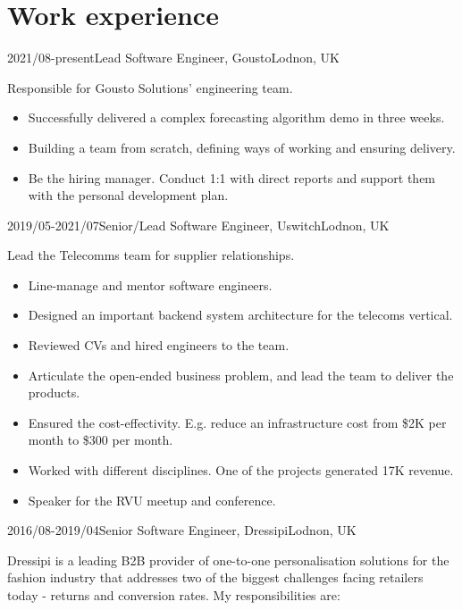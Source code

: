 \documentclass[a4paper]{twentysecondcv-english} %
\begin{document}
\section{Work experience}

\begin{twenty} %
	\twentyitem
	    {2021/08-present}{Lead Software Engineer, Gousto}{Lodnon, UK}
    	{Responsible for Gousto Solutions' engineering team.
        	\begin{itemize}
                \item Successfully delivered a complex forecasting algorithm demo in three weeks.
                \item Building a team from scratch, defining ways of working and ensuring delivery.
                \item Be the hiring manager. Conduct 1:1 with direct reports and support them with the personal development plan.
            \end{itemize}}
	\twentyitem
	    {2019/05-2021/07}{Senior/Lead Software Engineer, Uswitch}{Lodnon, UK}
    	{Lead the Telecomms team for supplier relationships.
        	\begin{itemize}
                \item Line-manage and mentor software engineers.
                \item Designed an important backend system architecture for the telecoms vertical.
                \item Reviewed CVs and hired engineers to the team.
                \item Articulate the open-ended business problem, and lead the team to deliver the products.
                \item Ensured the cost-effectivity. E.g. reduce an infrastructure cost from \$2K per month to \$300 per month.
                \item Worked with different disciplines. One of the projects generated \textsterling17K revenue.
                \item Speaker for the RVU meetup and conference.
                \end{itemize}}
	\twentyitem
	    {2016/08-2019/04}{Senior Software Engineer, Dressipi}{Lodnon, UK}
    	{Dressipi is a leading B2B provider of one-to-one personalisation solutions for the fashion industry that addresses two of the biggest challenges facing retailers today - returns and conversion rates. My responsibilities are:
        	\begin{itemize}

\end{itemize}}
\end{twenty}
\end{document}
